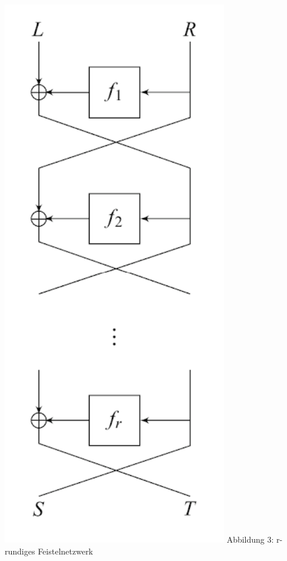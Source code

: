 \documentclass[course=erap]{aspdoc}
\begin{document}
\begin{multicols}{2}
{\begin{center}
    \includegraphics[scale=1]{img/r_round_feistel_cipher_enc.png}\break
    Abbildung 3: r-rundiges Feistelnetzwerk \cite[Fig. 2.2]{nachef}
\end{center}
}
\end{multicols}
\end{document}
